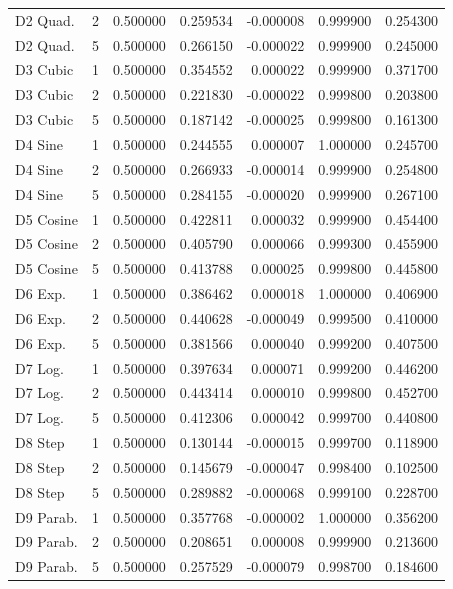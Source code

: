 \begin{tabular}{lrrrrrr}
    D2 Quad. &    2 & 0.500000 &    0.259534 &  -0.000008 & 0.999900 &          0.254300 \\
    D2 Quad. &    5 & 0.500000 &    0.266150 &  -0.000022 & 0.999900 &          0.245000 \\
    D3 Cubic &    1 & 0.500000 &    0.354552 &   0.000022 & 0.999900 &          0.371700 \\
    D3 Cubic &    2 & 0.500000 &    0.221830 &  -0.000022 & 0.999800 &          0.203800 \\
    D3 Cubic &    5 & 0.500000 &    0.187142 &  -0.000025 & 0.999800 &          0.161300 \\
     D4 Sine &    1 & 0.500000 &    0.244555 &   0.000007 & 1.000000 &          0.245700 \\
     D4 Sine &    2 & 0.500000 &    0.266933 &  -0.000014 & 0.999900 &          0.254800 \\
     D4 Sine &    5 & 0.500000 &    0.284155 &  -0.000020 & 0.999900 &          0.267100 \\
   D5 Cosine &    1 & 0.500000 &    0.422811 &   0.000032 & 0.999900 &          0.454400 \\
   D5 Cosine &    2 & 0.500000 &    0.405790 &   0.000066 & 0.999300 &          0.455900 \\
   D5 Cosine &    5 & 0.500000 &    0.413788 &   0.000025 & 0.999800 &          0.445800 \\
     D6 Exp. &    1 & 0.500000 &    0.386462 &   0.000018 & 1.000000 &          0.406900 \\
     D6 Exp. &    2 & 0.500000 &    0.440628 &  -0.000049 & 0.999500 &          0.410000 \\
     D6 Exp. &    5 & 0.500000 &    0.381566 &   0.000040 & 0.999200 &          0.407500 \\
     D7 Log. &    1 & 0.500000 &    0.397634 &   0.000071 & 0.999200 &          0.446200 \\
     D7 Log. &    2 & 0.500000 &    0.443414 &   0.000010 & 0.999800 &          0.452700 \\
     D7 Log. &    5 & 0.500000 &    0.412306 &   0.000042 & 0.999700 &          0.440800 \\
     D8 Step &    1 & 0.500000 &    0.130144 &  -0.000015 & 0.999700 &          0.118900 \\
     D8 Step &    2 & 0.500000 &    0.145679 &  -0.000047 & 0.998400 &          0.102500 \\
     D8 Step &    5 & 0.500000 &    0.289882 &  -0.000068 & 0.999100 &          0.228700 \\
   D9 Parab. &    1 & 0.500000 &    0.357768 &  -0.000002 & 1.000000 &          0.356200 \\
   D9 Parab. &    2 & 0.500000 &    0.208651 &   0.000008 & 0.999900 &          0.213600 \\
   D9 Parab. &    5 & 0.500000 &    0.257529 &  -0.000079 & 0.998700 &          0.184600 \\
\bottomrule
\end{tabular}
